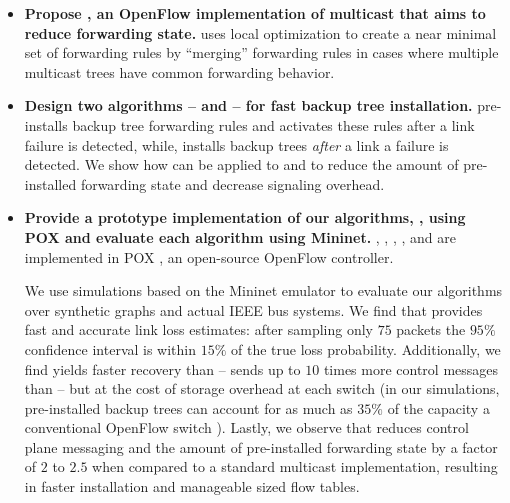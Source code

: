 \begin{itemize}
	\item {\bf Propose \merges, an OpenFlow implementation of multicast that aims to reduce forwarding state.}  \merge uses local optimization to create a near minimal set of forwarding rules 
	by ``merging'' forwarding rules in cases where multiple multicast trees have common forwarding behavior.

	\item {\bf Design two algorithms -- \pre and \post -- for fast backup tree installation.}  \pre pre-installs backup tree forwarding rules and
	activates these rules after a link failure is detected, while, \post installs backup trees \emph{after} a link a failure is detected.  
	We show how \merge can be applied to \pre and \post to reduce the amount of \pre pre-installed forwarding state and decrease \post signaling overhead. 

	\item {\bf Provide a prototype implementation of our algorithms, \mdrs, using POX and 
	evaluate each algorithm using Mininet.} \pcnts, \steiners, \merges, \pres, and \post are implemented in POX \cite{Pox}, 
	an open-source OpenFlow controller. 
	
	We use simulations based on the Mininet emulator \cite{Lantz10} to evaluate our algorithms over synthetic graphs and actual IEEE bus systems.
	We find that \pcnt provides fast and accurate link loss estimates: after sampling only $75$ packets
	the $95\%$ confidence interval is within $15\%$ of the true loss probability.  Additionally, we find \pre yields faster recovery than \post -- 
	\post sends up to $10$ times more control messages than \pre -- but at the cost of storage overhead at each switch (in our simulations, pre-installed backup trees can account for as much
	as $35\%$ of the capacity a conventional OpenFlow switch \cite{Curtis11}).
	Lastly, we observe that \merge reduces control plane messaging and the amount of pre-installed forwarding state by a factor of $2$ to $2.5$ when compared to a standard multicast
	implementation, resulting in faster installation and manageable sized flow tables.


		
\end{itemize}

